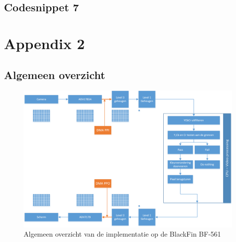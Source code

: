 \newpage
\section{Codesnippet 7}


\chapter{Appendix 2}
\newpage
\section{Algemeen overzicht}
\label{app:algemeenoverzicht}
	\begin{figure}[H]
		\centering
		\includegraphics[width=19cm, angle = 90]{Chapters/Chapter2/Images/implementationOverview.png}
		\caption{Algemeen overzicht van de implementatie op de BlackFin BF-561}
	\end{figure}
